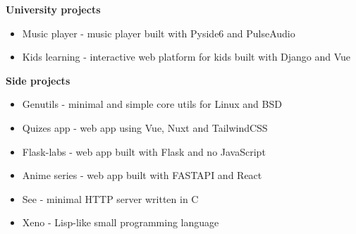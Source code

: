 {
    {\vspace{0.5cm} \hspace{-0.5cm} \Large \textbf{University projects}}
    \begin{itemize}
        \item {Music player - music player built with Pyside6 and PulseAudio}
        \item {Kids learning - interactive web platform for kids built with Django and Vue}
    \end{itemize}

    {\vspace{0.5cm} \hspace{-1cm} \Large \textbf{Side projects}}

    \begin{itemize}
        \item {Genutils - minimal and simple core utils for Linux and BSD}
        \item {Quizes app - web app using Vue, Nuxt and TailwindCSS}
        \item {Flask-labs - web app built with Flask and no JavaScript}
        \item {Anime series - web app built with FASTAPI and React}
        \item {See - minimal HTTP server written in C}
        \item {Xeno - Lisp-like small programming language}
    \end{itemize}
}

